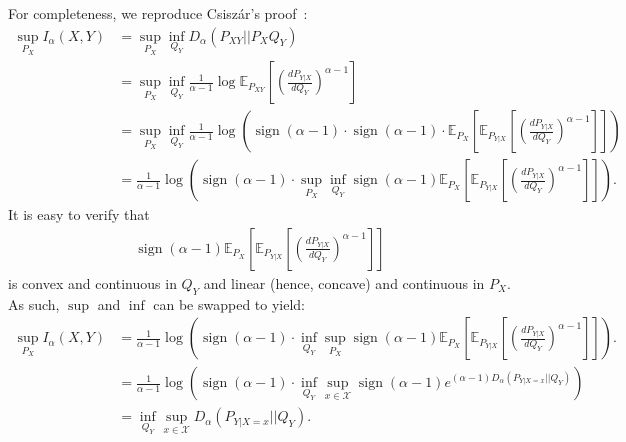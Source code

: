 \documentclass{article}
\numberwithin{theorem}{section}
\numberwithin{example}{section}
\numberwithin{remark}{section}
\numberwithin{definition}{section}
\newcommand{\E}{\mathbb{E}}
\DeclareMathOperator{\sign}{sign}
\newcommand{\X}{\mathcal{X}}
\begin{document}
For completeness, we reproduce Csisz\'ar's proof~\cite{csiszar:95}:
\begin{align}
    \sup_{P_X} I_\alpha(X,Y) & 
    = \sup_{P_X} \inf_{Q_Y} D_\alpha(P_{XY} || P_X Q_Y) \\
    & = \sup_{P_X} \inf_{Q_Y} \frac{1}{\alpha-1} \log \E_{P_{XY}}  \left[   \left( \frac{dP_{Y|X}}{d Q_Y} \right)^{\alpha-1}     \right] \\
    & = \sup_{P_X} \inf_{Q_Y} \frac{1}{\alpha-1} \log \left( \sign(\alpha-1) \cdot \sign (\alpha-1) \cdot  \E_{P_X} \left[ \E_{P_{Y|X}} \left[   \left( \frac{dP_{Y|X}}{d Q_Y} \right)^{\alpha-1}  \right]   \right]   \right) \\
    & = \frac{1}{\alpha-1} \log \left( \sign(\alpha-1) \cdot \sup_{P_X} \inf_{Q_Y} \sign (\alpha-1)  \E_{P_X} \left[ \E_{P_{Y|X}} \left[   \left( \frac{dP_{Y|X}}{d Q_Y} \right)^{\alpha-1}  \right]   \right] \right).
\end{align}
It is easy to verify that
\begin{align}
    \sign (\alpha-1)  \E_{P_X} \left[ \E_{P_{Y|X}} \left[   \left( \frac{dP_{Y|X}}{d Q_Y} \right)^{\alpha-1}  \right]   \right] 
\end{align}
is convex and continuous in $Q_Y$ and linear (hence, concave) and continuous in $P_X$. As such, $\sup$ and $\inf$ can be swapped to yield:
\begin{align}
    \sup_{P_X} I_\alpha(X,Y) & 
    = \frac{1}{\alpha-1} \log \left( \sign(\alpha-1) \cdot  \inf_{Q_Y}  \sup_{P_X} \sign (\alpha-1)  \E_{P_X} \left[ \E_{P_{Y|X}} \left[   \left( \frac{dP_{Y|X}}{d Q_Y} \right)^{\alpha-1}  \right]   \right] \right). \\
    & = \frac{1}{\alpha-1} \log \left( \sign(\alpha-1) \cdot \inf_{Q_Y} \sup_{x \in \X} \sign (\alpha-1) e^{(\alpha-1) D_\alpha (P_{Y|X=x} || Q_Y  ) } \right) \\
    & = \inf_{Q_Y} \sup_{x \in \X} D_\alpha \left( P_{Y|X=x} || Q_Y \right).
\end{align}
\end{document}
